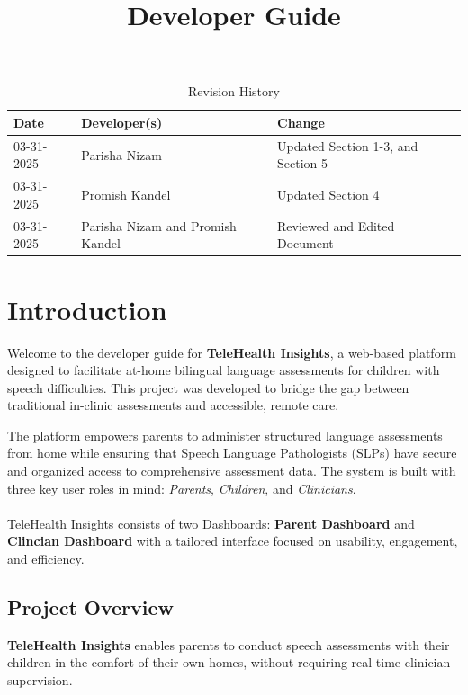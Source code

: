 \documentclass{article}
\title{Developer Guide\\\progname}
\author{\authname}
\date{}
\begin{document}
\maketitle
\newpage

\begin{table}[h!]
\caption{Revision History} \label{TblRevisionHistory}
\begin{tabularx}{\textwidth}{llX}
\toprule
\textbf{Date} & \textbf{Developer(s)} & \textbf{Change}\\
\midrule
03-31-2025 & Parisha Nizam & Updated Section 1-3, and Section 5\\
03-31-2025 & Promish Kandel & Updated Section 4\\
03-31-2025 & Parisha Nizam and Promish Kandel & Reviewed and Edited Document\\
\bottomrule
\end{tabularx}
\end{table}

\newpage


\tableofcontents


\newpage

\section{Introduction}

Welcome to the developer guide for \textbf{TeleHealth Insights}, a web-based platform designed to facilitate at-home bilingual language assessments for children with speech difficulties. This project was developed to bridge the gap between traditional in-clinic assessments and accessible, remote care. 

The platform empowers parents to administer structured language assessments from home while ensuring that Speech Language Pathologists (SLPs) have secure and organized access to comprehensive assessment data. 
The system is built with three key user roles in mind: \textit{Parents}, \textit{Children}, and \textit{Clinicians}. \\\\
TeleHealth Insights consists of two Dashboards:  \textbf{Parent Dashboard} and  \textbf{Clincian Dashboard} with a tailored interface focused on usability, engagement, and efficiency.

\subsection{Project Overview}

\textbf{TeleHealth Insights} enables parents to conduct speech assessments with their children in the comfort of their own homes, without requiring real-time clinician supervision.
\end{document}
